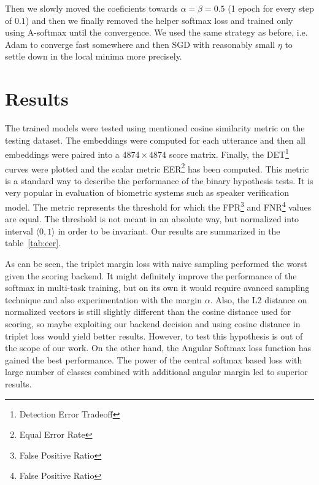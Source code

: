 \medskip
\noindent
Then we slowly moved the coeficients towards $ \alpha = \beta = 0.5 $ (1 epoch for every step of $ 0.1 $) and then we finally removed the helper softmax loss and trained only using A-softmax until the convergence. We used the same strategy as before, i.e. Adam to converge fast somewhere and then SGD with reasonably small $ \eta $ to settle down in the local minima more precisely.

\section{Results}

The trained models were tested using mentioned cosine similarity metric on the testing dataset. The embeddings were computed for each utterance and then all embeddings were paired into a $ 4874 \times 4874 $ score matrix. Finally, the DET\footnote{Detection Error Tradeoff} curves were plotted and the scalar metric EER\footnote{Equal Error Rate} has been computed. This metric is a standard way to describe the performance of the binary hypothesis tests. It is very popular in evaluation of biometric systems such as speaker verification model. The metric represents the threshold for which the FPR\footnote{False Positive Ratio} and FNR\footnote{False Positive Ratio} values are equal. The threshold is not meant in an absolute way, but normalized into interval $ \langle 0, 1 \rangle $ in order to be invariant. Our results are summarized in the table~\ref{tab:eer}.



\medskip
\noindent
As can be seen, the triplet margin loss with naive sampling performed the worst given the scoring backend. It might definitely improve the performance of the softmax in multi-task training, but on its own it would require avanced sampling technique and also experimentation with the margin $ \alpha $. Also, the L2 distance on normalized vectors is still slightly different than the cosine distance used for scoring, so maybe exploiting our backend decision and using cosine distance in triplet loss would yield better results. However, to test this hypothesis is out of the scope of our work. On the other hand, the Angular Softmax loss function has gained the best performance. The power of the central softmax based loss with large number of classes combined with additional angular margin led to superior results.

